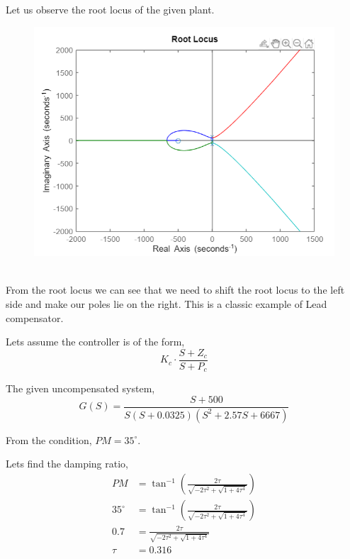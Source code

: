 \documentclass[12pt]{article}
\begin{document}
\begin{minipage}{0.3\linewidth} \par
  Let us observe the root locus of the given plant.
\end{minipage}%
\hfill
\begin{minipage}{0.65\linewidth}
  \begin{figure}[H]
    \centering
    \includegraphics[width=\linewidth]{images/plot4.png}
    \label{fig:plot_4}
  \end{figure}
\end{minipage} \\[9pt]

From the root locus we can see that we need to shift the root locus to the left side and make our poles lie on the right. This is a classic example of Lead compensator. \par

Lets assume the controller is of the form,
\begin{equation}
  K_c \cdot \frac{S + Z_c}{S + P_c}
\end{equation}

The given uncompensated system,
\begin{equation}
  G(S) = \frac{S+500}{S(S+0.0325)(S^2 + 2.57S + 6667)}
\end{equation}

From the condition, \(PM = 35^\circ\). \par
Lets find the damping ratio,
\begin{equation}
  \begin{aligned}
    PM &= \tan^{-1}(\frac{2\tau}{\sqrt{-2\tau^2 + \sqrt{1 + 4\tau^4}}}) \\
    35^\circ &= \tan^{-1}(\frac{2\tau}{\sqrt{-2\tau^2 + \sqrt{1 + 4\tau^4}}}) \\
    0.7 &= \frac{2\tau}{\sqrt{-2\tau^2 + \sqrt{1 + 4\tau^4}}} \\
    \tau &= 0.316
  \end{aligned}
\end{equation}
\end{document}
